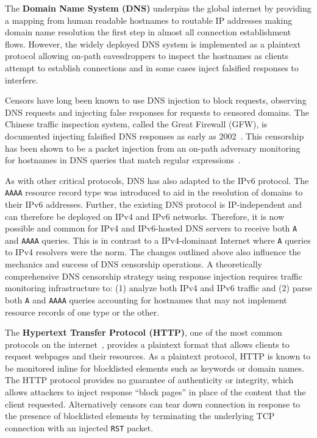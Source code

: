 The {\bf Domain Name System (DNS)} underpins the global internet by providing
a mapping from human readable hostnames to routable IP addresses making domain
name resolution the first step in almost all connection establishment flows.
However, the widely deployed DNS system is implemented as a plaintext protocol
allowing on-path eavesdroppers to inspect the hostnames as clients attempt to
establish connections and in some cases inject falsified responses to interfere.

Censors have long been known to use DNS injection to block requests, observing
DNS requests and injecting false responses for requests to censored domains.
The Chinese traffic inspection system, called the Great Firewall (GFW), is
documented injecting falsified DNS responses as early as
2002~\cite{global2002great}. This censorship has been shown to be a packet
injection from an on-path adversary monitoring for hostnames in DNS queries
that match regular expressions~\cite{USESEC21:GFWatch}.

As with other critical protocols, DNS has also adapted to the IPv6 protocol.
The {\tt AAAA} resource record type was introduced to aid in the resolution of
domains to their IPv6 addresses. Further, the existing DNS protocol is
IP-independent and can therefore be deployed on IPv4 and IPv6 networks.
Therefore, it is now possible and common for IPv4 and IPv6-hosted DNS servers
to receive both {\tt A} and {\tt AAAA} queries. This is in contrast to
a IPv4-dominant Internet where {\tt A} queries to IPv4 resolvers were the norm.
The changes outlined above also influence the mechanics and success of DNS
censorship operations. A theoretically comprehensive DNS censorship strategy
using response injection requires traffic monitoring infrastructure to: (1)
analyze both IPv4 and IPv6 traffic and (2) parse both \texttt{A} and
\texttt{AAAA} queries accounting for hostnames that may not implement resource
records of one type or the other.

The {\bf Hypertext Transfer Protocol (HTTP)}, one of the most common
protocols on the internet~\cite{}, provides a plaintext format that allows
clients to request webpages and their resources. As a plaintext protocol, HTTP
is known to be monitored inline for blocklisted elements such as keywords or
domain names. The HTTP protocol provides no guarantee of authenticity or
integrity, which allows attackers to inject response ``block pages'' in place of
the content that the client requested. Alternatively censors can tear down
connection in response to the presence of blocklisted elements by terminating
the underlying TCP connection with an injected \texttt{RST} packet.

